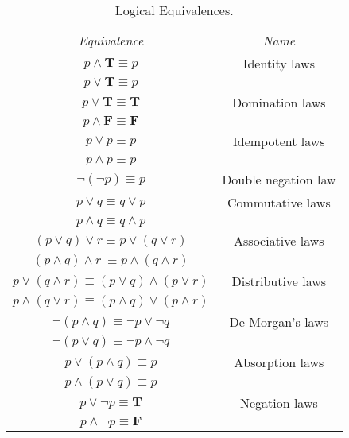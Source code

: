 \documentclass{Axon}
\begin{document}
\begin{table}[h]
    \centering
    \begin{tabular}{c|c}
        \textit{Equivalence}                                       & \textit{Name}       \\
        \(p \land \textbf{T} \equiv p\)                            & Identity laws       \\
        \(p \lor \textbf{T} \equiv p\)                             &                     \\
        \(p \lor \textbf{T} \equiv \textbf{T}\)                    & Domination laws     \\
        \(p \land \textbf{F} \equiv \textbf{F}\)                   &                     \\
        \(p \lor p \equiv p\)                                      & Idempotent laws     \\
        \(p \land p \equiv p\)                                     &                     \\
        \(\lnot (\lnot p) \equiv p\)                               & Double negation law \\
        \(p \lor q \equiv q \lor p\)                               & Commutative laws    \\
        \(p \land q \equiv q \land p\)                             &                     \\
        \((p \lor q) \lor r \equiv p \lor (q \lor r)\)             & Associative laws    \\
        \((p \land q) \land r\ \equiv p \land (q \land r)\)        &                     \\
        \(p \lor (q \land r) \equiv (p \lor q) \land (p \lor r)\)  & Distributive laws   \\
        \(p \land (q \lor r) \equiv (p \land q) \lor (p \land r)\) &                     \\
        \(\lnot (p \land q) \equiv \lnot p \lor \lnot q\)          & De Morgan's laws    \\
        \(\lnot (p \lor q) \equiv \lnot p \land \lnot q\)          &                     \\
        \(p \lor (p \land q) \equiv p\)                            & Absorption laws     \\
        \(p \land (p \lor q) \equiv p\)                            &                     \\
        \(p \lor \lnot p \equiv \textbf{T}\)                       & Negation laws       \\
        \(p \land \lnot p \equiv \textbf{F}\)                      &
    \end{tabular}
    \caption{Logical Equivalences.}
    \label{Table: 6}
\end{table}
\end{document}
